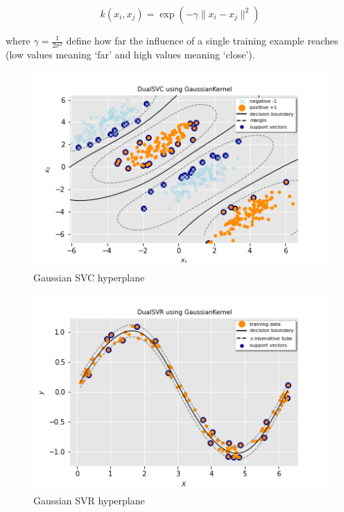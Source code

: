 \begin{equation} \label{eq:gaussian_kernel2}
	k(x_i,x_j)=\exp(-\gamma \|x_i-x_j\|^2)
\end{equation}

where $\displaystyle \gamma=\frac{1}{2\sigma^2}$ define how far the influence of a single training example reaches (low values meaning ‘far’ and high values meaning ‘close’).

\begin{figure}[h!]
	\includegraphics[scale=0.5]{img/gaussian_dual_svc_hyperplane.png}
	\caption{Gaussian SVC hyperplane}
	\label{fig:gaussian_dual_svc_hyperplane}
\end{figure}

\begin{figure}[h!]
	\includegraphics[scale=0.5]{img/gaussian_dual_svr_hyperplane.png}
	\caption{Gaussian SVR hyperplane}
	\label{fig:gaussian_dual_svr_hyperplane}
\end{figure}